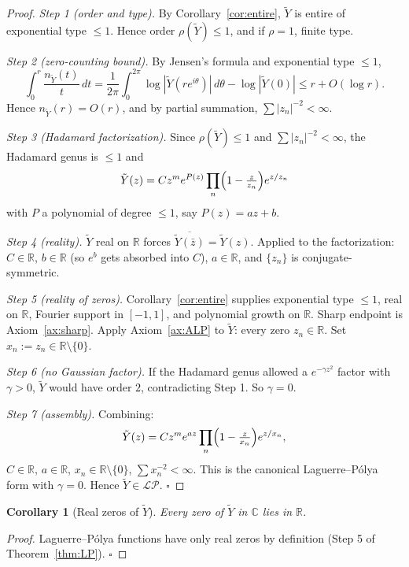 \documentclass[11pt]{article}
\newtheorem{corollary}[theorem]{Corollary}
\theoremstyle{definition}
\newcommand{\R}{\mathbb{R}}
\newcommand{\C}{\mathbb{C}}
\newcommand{\LP}{\mathcal{LP}}
\begin{document}
\begin{proof}
\emph{Step 1 (order and type).} By Corollary~\ref{cor:entire}, \(\tilde Y\) is entire of exponential type \(\le 1\). Hence order \(\rho(\tilde Y)\le 1\), and if \(\rho=1\), finite type.

\emph{Step 2 (zero-counting bound).} By Jensen's formula and exponential type \(\le 1\),
\[
\int_0^r\frac{n_{\tilde Y}(t)}{t}\,dt=\frac{1}{2\pi}\int_0^{2\pi}\log|\tilde Y(re^{i\theta})|\,d\theta-\log|\tilde Y(0)|\le r+O(\log r).
\]
Hence \(n_{\tilde Y}(r)=O(r)\), and by partial summation, \(\sum|z_n|^{-2}<\infty\).

\emph{Step 3 (Hadamard factorization).} Since \(\rho(\tilde Y)\le 1\) and \(\sum|z_n|^{-2}<\infty\), the Hadamard genus is \(\le 1\) and
\[
\tilde Y(z)=Cz^m e^{P(z)}\prod_n\Bigl(1-\tfrac{z}{z_n}\Bigr)e^{z/z_n}
\]
with \(P\) a polynomial of degree \(\le 1\), say \(P(z)=az+b\).

\emph{Step 4 (reality).} \(\tilde Y\) real on \(\R\) forces \(\overline{\tilde Y(\bar z)}=\tilde Y(z)\). Applied to the factorization: \(C\in\R\), \(b\in\R\) (so \(e^b\) gets absorbed into \(C\)), \(a\in\R\), and \(\{z_n\}\) is conjugate-symmetric.

\emph{Step 5 (reality of zeros).} Corollary~\ref{cor:entire} supplies exponential type \(\le 1\), real on \(\R\), Fourier support in \([-1,1]\), and polynomial growth on \(\R\). Sharp endpoint is Axiom~\ref{ax:sharp}. Apply Axiom~\ref{ax:ALP} to \(\tilde Y\): every zero \(z_n\in\R\). Set \(x_n:=z_n\in\R\setminus\{0\}\).

\emph{Step 6 (no Gaussian factor).} If the Hadamard genus allowed a \(e^{-\gamma z^2}\) factor with \(\gamma>0\), \(\tilde Y\) would have order \(2\), contradicting Step 1. So \(\gamma=0\).

\emph{Step 7 (assembly).} Combining:
\[
\tilde Y(z)=Cz^m e^{az}\prod_n\Bigl(1-\tfrac{z}{x_n}\Bigr)e^{z/x_n},
\]
\(C\in\R\), \(a\in\R\), \(x_n\in\R\setminus\{0\}\), \(\sum x_n^{-2}<\infty\). This is the canonical Laguerre--P\'olya form with \(\gamma=0\). Hence \(\tilde Y\in\LP\). \(\square\)
\end{proof}

\begin{corollary}[Real zeros of \(\tilde Y\)]\label{cor:realzeros}
Every zero of \(\tilde Y\) in \(\C\) lies in \(\R\).
\end{corollary}

\begin{proof}
Laguerre--P\'olya functions have only real zeros by definition (Step 5 of Theorem~\ref{thm:LP}). \(\square\)
\end{proof}
\end{document}
